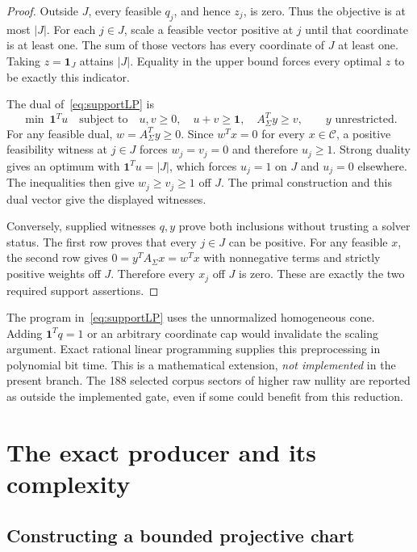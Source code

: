 \documentclass[11pt,letterpaper]{article}
\theoremstyle{definition}
\theoremstyle{remark}\newtheorem{remark}[theorem]{Remark}
\newcommand{\cone}{\mathcal C}\newcommand{\stdcone}{\mathcal S}
\begin{document}
\begin{proof}
Outside $J$, every feasible $q_j$, and hence $z_j$, is zero. Thus the
objective is at most $|J|$. For each $j\in J$, scale a feasible vector
positive at $j$ until that coordinate is at least one. The sum of those
vectors has every coordinate of $J$ at least one. Taking $z=\mathbf1_J$
attains $|J|$. Equality in the upper bound forces every optimal $z$ to
be exactly this indicator.

The dual of~\eqref{eq:supportLP} is
\[
 \min\ \mathbf1^Tu\quad\text{subject to}\quad
 u,v\ge0,\quad u+v\ge\mathbf1,\quad A_\Sigma^Ty\ge v,
 \qquad y\text{ unrestricted}.
\]
For any feasible dual, $w=A_\Sigma^Ty\ge0$. Since $w^Tx=0$ for
every $x\in\cone$, a positive feasibility witness at $j\in J$ forces
$w_j=v_j=0$ and therefore $u_j\ge1$. Strong duality gives an optimum
with $\mathbf1^Tu=|J|$, which forces $u_j=1$ on $J$ and $u_j=0$
elsewhere. The inequalities then give $w_j\ge v_j\ge1$ off $J$.
The primal construction and this dual vector give the displayed witnesses.

Conversely, supplied witnesses $q,y$ prove both inclusions without
trusting a solver status. The first row proves that every $j\in J$
can be positive. For any feasible $x$, the second row gives
$0=y^TA_\Sigma x=w^Tx$ with nonnegative terms and strictly positive
weights off $J$. Therefore every $x_j$ off $J$ is zero. These are exactly
the two required support assertions.
\end{proof}

The program in~\eqref{eq:supportLP} uses the unnormalized homogeneous
cone. Adding $\mathbf1^Tq=1$ or an arbitrary coordinate cap would invalidate
the scaling argument. Exact rational linear programming supplies this
preprocessing in polynomial bit time. This is a mathematical extension, \emph{not implemented} in the
present branch. The 188 selected corpus sectors of higher raw nullity are
reported as outside the implemented gate, even if some could benefit from
this reduction.

\section{The exact producer and its complexity}
\label{sec:algorithm}

\subsection{Constructing a bounded projective chart}
\end{document}
